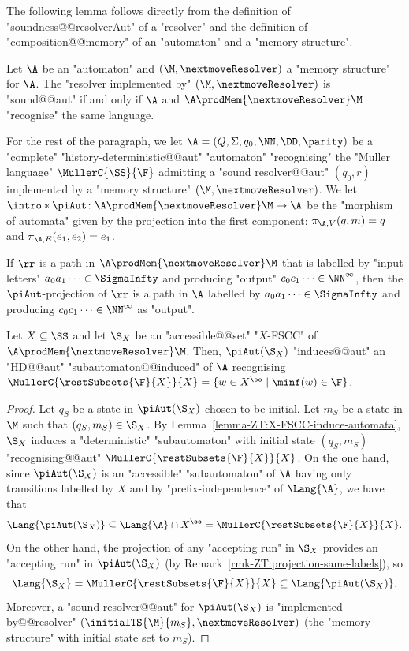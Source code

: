 \documentclass{theoretics}
\begin{document}
The following lemma follows directly from the definition of "soundness@@resolverAut" of a "resolver" and the definition of "composition@@memory" of an "automaton" and a "memory structure".
\begin{lemma}\label{lemma:validity-product-by-memory-HD-aut}
	Let $\A$ be an "automaton" and $(\M, \nextmoveResolver)$ a "memory structure" for $\A$. The "resolver implemented by" $(\M, \nextmoveResolver)$ is "sound@@aut" if and only if $\A$ and $\A\prodMem{\nextmoveResolver} \M$ "recognise" the same language. 
\end{lemma}


For the rest of the paragraph, we let $\A = (Q,\Sigma, q_0, \NN, \DD, \parity)$ be a "complete" "history-deterministic@@aut" "automaton" "recognising" the "Muller language" $\MullerC{\SS}{\F}$ admitting a "sound resolver@@aut" $(q_0,r)$ implemented by a "memory structure"  $(\M, \nextmoveResolver)$.
\AP We let $\intro*\piAut\colon \A \prodMem{\nextmoveResolver} \M \to \A$ be the "morphism of automata" given by the projection into the first component: $\pi_{\A,V}(q,m) = q$ and $\pi_{\A,E}(e_1,e_2) = e_1$.

\begin{remark}\label{rmk-ZT:projection-same-labels}
	If $\rr$ is a path in $\A \prodMem{\nextmoveResolver} \M$ that is labelled by "input letters" $a_0a_1\dots \in \SigmaInfty$ and producing "output" $c_0c_1\dots \in \NN^\infty$, then the $\piAut$-projection of $\rr$ is a path in $\A$ labelled  by $a_0a_1\dots \in \SigmaInfty$ and producing $c_0c_1\dots \in \NN^\infty$ as "output". 
\end{remark}

\begin{lemma}\label{lemma-ZT:X-FSCC-in-product-induce-subautomaton}
	Let $X\subseteq \SS$ and let $\S_X$ be an "accessible@@set" "$X$-FSCC" of $\A \prodMem{\nextmoveResolver} \M$. Then, $\piAut(\S_X)$ "induces@@aut" an "HD@@aut" "subautomaton@@induced" of $\A$ recognising $\MullerC{\restSubsets{\F}{X}}{X} = \{w\in X^\oo \mid \minf(w)\in \F\}$.
\end{lemma}
\begin{proof}
	Let $q_S$ be a state in $\piAut(\S_X)$ chosen to be initial. Let $m_S$ be a state in $\M$ such that $(q_S, m_S)\in \S_X$. By Lemma~\ref{lemma-ZT:X-FSCC-induce-automata}, $\S_X$ induces a "deterministic" "subautomaton" with initial state $(q_S, m_S)$ "recognising@@aut" $\MullerC{\restSubsets{\F}{X}}{X}$. 
	On the one hand, since $\piAut(\S_X)$ is an "accessible" "subautomaton" of $\A$ having only transitions labelled by $X$ and by "prefix-independence" of $\Lang{\A}$, we have that 
	\[ \Lang{\piAut(\S_X)} \subseteq \Lang{\A}\cap X^\oo = \MullerC{\restSubsets{\F}{X}}{X}. \]
	On the other hand, the projection of any "accepting run" in $\S_X$ provides an "accepting run" in $\piAut(\S_X)$ (by Remark~\ref{rmk-ZT:projection-same-labels}), so 
	\[\Lang{\S_X} = \MullerC{\restSubsets{\F}{X}}{X}\subseteq \Lang{\piAut(\S_X)}.\] 
	Moreover, a "sound resolver@@aut" for $\piAut(\S_X)$ is "implemented by@@resolver" $(\initialTS{\M}{m_S}, \nextmoveResolver)$ (the "memory structure" with initial state set to $m_S$).
\end{proof}
\end{document}
